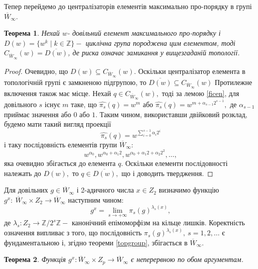 \documentclass[a4paper,12pt]{article} \usepackage{a4wide}
\numberwithin{equation}{subsection}
\newtheorem{theorem}{Теорема}[subsection]
\begin{document}
Тепер перейдемо до централізаторів елементів максимально про-порядку в групі $\overline{W}_{\infty}.$
 \begin{theorem} \label{cent1}Нехай $ w$- довільний елемент максимального
  про-порядку і $D(w)= \{ w^k\mid k\in \mathbb{Z} \} -$ циклічна група породжена цим елементом,
   тоді $ C_{\overline{W}_\infty}(w)=\overline{D(w)}$,
   де риска означає замикання у вищезгаданій топології.
     \end{theorem}
\begin{proof}
 Очевидно, що $D(w)\subseteq C_{\overline{W}_\infty}(w)$.
 Оскільки централізатор елемента в топологічній групі є замкненою підгрупою,
  то $\overline{D(w)}\subseteq C_{\overline{W}_\infty}(w)$
      Протилежне включення також має місце. Нехай $q \in C_{\overline{W}_\infty}(w),$ тоді за лемою \ref{ficen},
для довільного $s$ існує $m$ таке, що  $\hat{\pi_s}(q) = w^m$ або $\hat{\pi_s}(q) = w^{m + \alpha_{s-1} 2^{s-1}},$ де
$\alpha_{s-1}$ приймає значення або $0$ або $1$. Таким чином, використавши двійковий розклад, будемо мати такий вигляд
проекції
\[\hat{\pi_s}(q) = w^{\sum_{i=0}^{s-1} \alpha_i 2^i} \]
і таку послідовність елементів групи $\overline{W}_{\infty}$:
 \[ w^{\alpha_0},w^{\alpha_0+ \alpha_1 2},w^{\alpha_0+ \alpha_1 2+ \alpha_2 2^2}, \ldots ,\]
яка очевидно збігається до елемента $q.$ Оскільки елементи послідовності належать до $D(w),$ то
 $q \in \overline{D(w)},$ що і доводить твердження.
 \end{proof}

Для довільних  $g \in \overline{W}_{\infty}$ і 2-адичного числа $x \in Z_2$ визначимо функцію $g^x: \
\overline{W}_{\infty} \times Z_2 \to \overline{W}_{\infty}$ наступним чином:
\begin{equation}
g^x = \lim_{s \to + \infty} \pi_s(g)^{\lambda_s(x)},
\end{equation}
де $\lambda_s: Z_2 \to \mathbb{Z}/ 2^s \mathbb{Z} -$ канонічний епімоморфізм на кільце лишків. Коректність означення
випливає з того, що послідовність $\pi_s(g)^{\lambda_s(x)}, \  s=1,2, \ldots $  є фундаментальною і, згідно теореми
\ref{topgroup}, збігається в $ \overline{W}_\infty .$
\begin{theorem} Функція
 $g^x: \overline{W}_\infty \times Z_p\rightarrow\overline{W}_\infty $
  є неперервною по обом аргументам.
\end{theorem}
\end{document}
